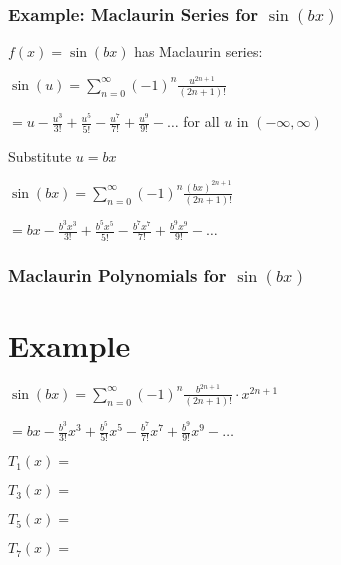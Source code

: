 \documentclass{beamer}
\begin{document}
\begin{frame}
\frametitle{Example: Maclaurin Series for $\sin(bx)$} 
$\displaystyle f(x) = \sin(bx)$ has Maclaurin series:\newline

$\displaystyle \sin(u) =  \sum_{n=0}^\infty (-1)^n \frac{u^{2n+1}}{(2n+1)!}$\newline

$\displaystyle = u-\frac{u^3}{3!} + \frac{u^5}{5!} - \frac{u^7}{7!}+\frac{u^9}{9!}- \dots$  for all $u$ in $(-\infty, \infty)$ \newline

Substitute $u=bx$

$\displaystyle \sin(bx) =  \sum_{n=0}^\infty (-1)^n \frac{(bx)^{2n+1}}{(2n+1)!}$ \newline

\vspace{0.5 cm}
$\displaystyle = bx-\frac{b^3x^3}{3!} + \frac{b^5x^5}{5!} - \frac{b^7x^7}{7!}+\frac{b^9x^9}{9!}- \dots$ \newline



\vspace{6.5 cm}
\end{frame}







\begin{frame}
\frametitle{Maclaurin Polynomials for $\sin(bx)$}
\section{Example}

$\displaystyle \sin(bx) =  \sum_{n=0}^\infty (-1)^n \frac{b^{2n+1}}{(2n+1)!} \cdot x^{2n+1} $ \newline

\vspace{0.5 cm}
$\displaystyle = bx-\frac{b^3}{3!}x^3 + \frac{b^5}{5!}x^5 - \frac{b^7}{7!}x^7+\frac{b^9}{9!}x^9- \dots$ \newline
\vspace{0.3 cm}

$\displaystyle T_1(x) = $ \newline
\vspace{0.1 cm}

$\displaystyle T_3(x) = $ \newline
\vspace{0.1 cm}

$\displaystyle T_5(x) = $ \newline
\vspace{0.1 cm}

$\displaystyle T_7(x) = $ \newline
\vspace{6.5 cm}
\end{frame}
\end{document}
